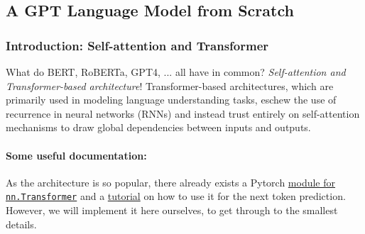 \subsection{A GPT Language Model from Scratch}
\subsubsection{Introduction: Self-attention and Transformer}

What do BERT, RoBERTa, GPT4, ... all have in common? \emph{Self-attention and Transformer-based architecture}! 
Transformer-based architectures, which are primarily used in modeling language understanding tasks, eschew the use of recurrence in neural networks (RNNs) and instead trust entirely on self-attention mechanisms to draw global dependencies between inputs and outputs.


\paragraph{Some useful documentation:} 
As the architecture is so popular, there already exists a Pytorch \href{https://pytorch.org/docs/stable/generated/torch.nn.Transformer.html}{module for {\tt nn.Transformer}}
and a \href{https://pytorch.org/tutorials/beginner/transformer_tutorial.html}{tutorial} on how to use it for the next token prediction.
However, we will implement it here ourselves, to get through to the smallest details.

